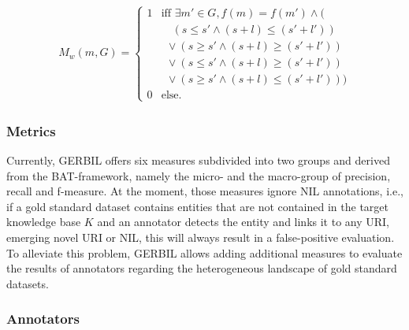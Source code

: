\begin{align}
M_w (m,G)=
\begin{cases}
1 &  \text{iff }\exists m' \in G, f(m) = f(m')  \land (\\
 &\ \ \ \,\, ( s \leq s' \land (s+l) \leq (s'+l') )\\ %
 &\ \ \lor ( s \geq s' \land (s+l) \geq (s'+l') )\\ %
 &\ \ \lor ( s \leq s' \land (s+l) \geq (s'+l') )\\ %
 &\ \ \lor ( s \geq s' \land (s+l) \leq (s'+l') ))\\ %
0 & \text{else.}
\end{cases}
\end{align}

\newpage
\subsubsection{Metrics}
Currently, GERBIL offers six measures subdivided into two groups and derived from the BAT-framework, namely the micro- and the macro-group of precision, recall and f-measure.
At the moment, those measures ignore NIL annotations, i.e., if a gold standard dataset contains entities that are not contained in the target knowledge base $K$ and an annotator detects the entity and links it to any URI, emerging novel URI or NIL, this will always result in a false-positive evaluation. 
To alleviate this problem, GERBIL allows adding additional measures to evaluate the results of annotators regarding the heterogeneous landscape of gold standard datasets.

\subsubsection{Annotators}
\label{sec:annotators}

